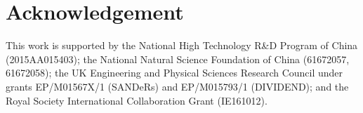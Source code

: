 \section*{Acknowledgement}
This work is supported by the National High Technology R\&D Program of China (2015AA015403); 
the National Natural Science Foundation of China (61672057, 61672058);
the UK Engineering and Physical Sciences Research Council under
grants EP/M01567X/1 (SANDeRs) and EP/M015793/1 (DIVIDEND);
and the Royal Society International Collaboration Grant (IE161012). 